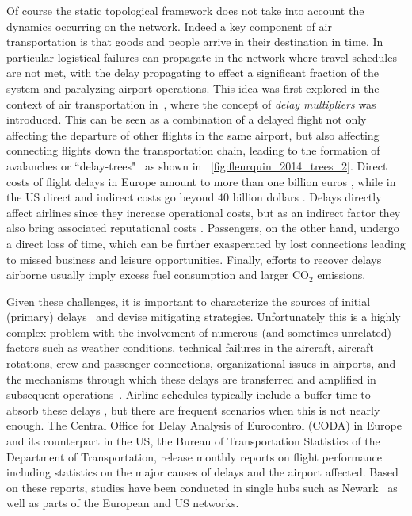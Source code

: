 Of course the static topological framework does not take into account the dynamics occurring on the network. Indeed a key component of air transportation is that goods and people arrive in their destination in time. In particular logistical failures can propagate in the network where travel schedules are not met, with the delay propagating to effect a significant fraction of the system and paralyzing airport operations. This idea was first explored in the context of air transportation in~\cite{beatty_1998_preliminary}, where the concept of \emph{delay multipliers} was introduced. This can be seen as a combination of a delayed flight not only affecting the departure of other flights in the same airport, but also affecting connecting flights down the transportation chain, leading to the formation of avalanches or ``delay-trees"~\cite{fleurquin_2014_trees} as shown in \figurename~\ref{fig:fleurquin_2014_trees_2}. Direct costs of flight delays in Europe amount to more than one billion euros \cite{cook_2011_european}, while in the US direct and indirect costs go beyond $40$ billion dollars \cite{joint_2008_your}. Delays directly affect airlines since they increase operational costs, but as an indirect factor they also bring associated reputational costs \cite{folkes_1987_field,mayer_2003_network}. Passengers, on the other hand, undergo a direct loss of time, which can be further exasperated by lost connections leading to missed business and leisure opportunities. Finally, efforts to recover delays airborne usually imply excess fuel consumption and larger CO$_2$ emissions. 

Given these challenges, it is important to characterize the sources of initial (primary) delays~\cite{rupp_2007_further,ahmadbeygi_2008_analysis} and devise mitigating strategies. Unfortunately this is a highly complex problem with the involvement of numerous (and sometimes unrelated) factors such as weather conditions, technical failures in the aircraft, aircraft rotations, crew and passenger connections, organizational issues in airports, and the mechanisms through which these delays are transferred and amplified in subsequent operations~\cite{bonnefoy_2007_scalability, beatty_1998_preliminary, wang_2003_flight}. Airline schedules typically include a buffer time to absorb these delays \cite{wu_2000_aircraft}, but there are frequent scenarios when this is not nearly enough. The Central Office for Delay Analysis of Eurocontrol (CODA) in Europe and its counterpart in the US, the Bureau of Transportation Statistics of the Department of Transportation, release monthly reports on flight performance including statistics on the major causes of delays and the airport affected. Based on these reports, studies have been conducted in single hubs such as Newark~\cite{allan_2001_analysis} as well as parts of the European \cite{cook_2007_european, jetzki_2009_propagation} and US \cite{mayer_2003_network,churchill_2007_examining,fleurquin_2014_trees} networks. 

